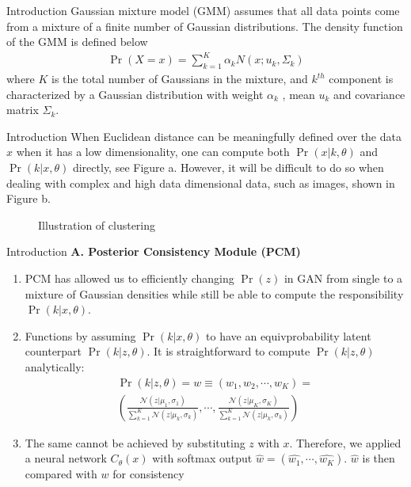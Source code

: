 \documentclass{beamer}
\providecommand{\pr}[1]{\ensuremath{\Pr\left(#1\right)}}
\begin{document}
\begin{frame}{Introduction}
Gaussian mixture model (GMM) assumes that all data points come from a mixture of a finite number of Gaussian distributions. The density function of the GMM is defined below
\begin{align}
    \pr{X=x}=\sum_{k=1}^{K}\alpha_{k}N(x;u_{k},\Sigma_{k})
\end{align}
where $K$ is the total number of Gaussians in the mixture, and $k^{th}$ component is characterized by a Gaussian distribution with weight $\alpha_{k}$ , mean $u_k$ and covariance matrix $\Sigma_{k}.$

\end{frame}


\begin{frame}{Introduction}
When Euclidean distance can be meaningfully defined over the data $x$ when it has a low dimensionality, one can compute both $\pr{x|k,\theta}$ and $\pr{k|x,\theta}$ directly, see Figure a. However, it will be difficult to do
so when dealing with complex and high data dimensional
data, such as images, shown in Figure b.

\begin{figure}[!tbp]
  \centering
  \hfill
  \caption{ Illustration of clustering}
\end{figure}
\end{frame}



\begin{frame}{Introduction}
\textbf{A. Posterior Consistency Module (PCM)}
\begin{enumerate}[]
\item PCM has allowed us to efficiently changing $\pr{z}$ in
GAN from single to a mixture of Gaussian densities while still be able to compute the responsibility $\pr{k|x,\theta}$.
\item Functions by assuming $\pr{k|x,\theta}$ to have an equivprobability latent counterpart $\pr{k|z,\theta}$. It is straightforward to compute $\pr{k|z,\theta}$ analytically:
\begin{align}
    \pr{k|z,\theta}=w \equiv (w_1,w_2,\cdots,w_K)=\\
    \left( \frac{\mathcal{N}(z|\mu_1,\sigma_1)}{\sum_{k=1}^{K}\mathcal{N}(z|\mu_k,\sigma_k)},\cdots,
    \frac{\mathcal{N}(z|\mu_K,\sigma_K)}{\sum_{k=1}^{K}\mathcal{N}(z|\mu_k,\sigma_k)}\right)
\end{align}
\item The same cannot be achieved by substituting $z$ with $x$. Therefore, we applied a neural network $C_{\theta}(x)$ with softmax output $\hat{w} = (\hat{w_1},\cdots,\hat{w_K})$. $\hat{w}$ is then compared with $w$ for consistency
\end{enumerate}
\end{frame}
\end{document}
